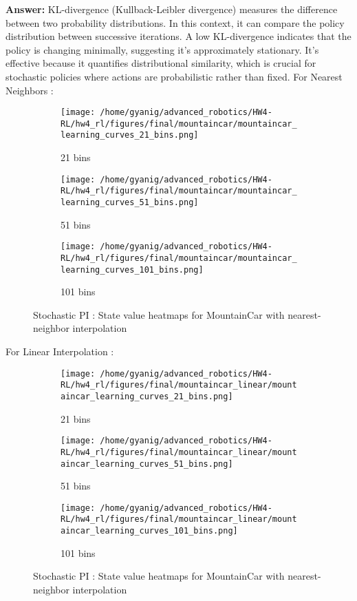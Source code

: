 \documentclass{article}
\newenvironment{answer}{{\bf Answer:} \sf }{}%
\begin{document}
\begin{enumerate}[a)]
    \begin{answer}
    KL-divergence (Kullback-Leibler divergence) measures the difference between two probability distributions. In this context, it can compare the policy distribution between successive iterations. A low KL-divergence indicates that the policy is changing minimally, suggesting it’s approximately stationary. It’s effective because it quantifies distributional similarity, which is crucial for stochastic policies where actions are probabilistic rather than fixed.
    \end{answer}
    For Nearest Neighbors :
    \begin{figure}[h]
        \centering
        \begin{subfigure}{0.32\textwidth}
            \texttt{[image: /home/gyanig/advanced\_robotics/HW4-RL/hw4\_rl/figures/final/mountaincar/mountaincar\_learning\_curves\_21\_bins.png]}
            \caption{21 bins}
        \end{subfigure}
        \begin{subfigure}{0.32\textwidth}
            \texttt{[image: /home/gyanig/advanced\_robotics/HW4-RL/hw4\_rl/figures/final/mountaincar/mountaincar\_learning\_curves\_51\_bins.png]}
            \caption{51 bins}
        \end{subfigure}
        \begin{subfigure}{0.32\textwidth}
            \texttt{[image: /home/gyanig/advanced\_robotics/HW4-RL/hw4\_rl/figures/final/mountaincar/mountaincar\_learning\_curves\_101\_bins.png]}
            \caption{101 bins}
        \end{subfigure}
        \caption{Stochastic PI : State value heatmaps for MountainCar with nearest-neighbor interpolation}
    \end{figure}

    For Linear Interpolation :
    \begin{figure}[h]
        \centering
        \begin{subfigure}{0.32\textwidth}
            \texttt{[image: /home/gyanig/advanced\_robotics/HW4-RL/hw4\_rl/figures/final/mountaincar\_linear/mountaincar\_learning\_curves\_21\_bins.png]}
            \caption{21 bins}
        \end{subfigure}
        \begin{subfigure}{0.32\textwidth}
            \texttt{[image: /home/gyanig/advanced\_robotics/HW4-RL/hw4\_rl/figures/final/mountaincar\_linear/mountaincar\_learning\_curves\_51\_bins.png]}
            \caption{51 bins}
        \end{subfigure}
        \begin{subfigure}{0.32\textwidth}
            \texttt{[image: /home/gyanig/advanced\_robotics/HW4-RL/hw4\_rl/figures/final/mountaincar\_linear/mountaincar\_learning\_curves\_101\_bins.png]}
            \caption{101 bins}
        \end{subfigure}
        \caption{Stochastic PI : State value heatmaps for MountainCar with nearest-neighbor interpolation}
    \end{figure}
    \newpage
\end{enumerate}
\end{document}
